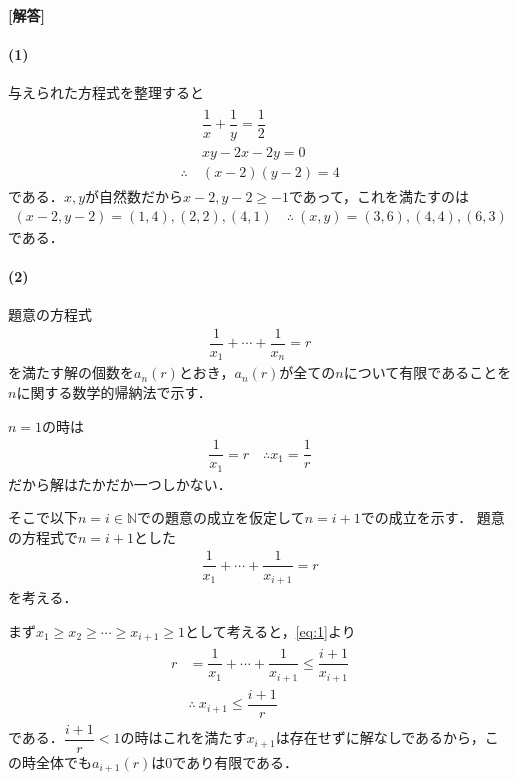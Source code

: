 \documentclass[../../main.tex]{subfiles}
\begin{document}
\begin{oframed}
  
\end{oframed}

{\bf [解答]}

\paragraph{(1)}

与えられた方程式を整理すると
\begin{align}
  \begin{split}
    & \dfrac{1}{x}+\dfrac{1}{y}=\dfrac{1}{2} \\
    & xy-2x-2y=0 \\
    \therefore\
    &(x-2)(y-2)=4
  \end{split}
\end{align}
である．$x, y$が自然数だから$x-2, y-2 \ge -1$であって，これを満たすのは
\begin{align}
  (x-2,y-2)=(1,4),(2,2),(4,1) \quad\therefore\ (x,y)=(3,6),(4,4),(6,3)
\end{align}
である．

\paragraph{(2)}

題意の方程式
\begin{align}
  \dfrac{1}{x_1}+\cdots+\dfrac{1}{x_{n}} = r
\end{align}
を満たす解の個数を$a_n(r)$とおき，$a_n(r)$が全ての$n$について有限であることを$n$に関する数学的帰納法で示す．

$n=1$の時は
\begin{align}
  \dfrac{1}{x_1} = r \quad\therefore x_1 = \dfrac{1}{r}
\end{align}
だから解はたかだか一つしかない．

そこで以下$n=i\in\mathbb{N}$での題意の成立を仮定して$n=i+1$での成立を示す．
題意の方程式で$n=i+1$とした
\begin{align}
  \dfrac{1}{x_1}+\cdots+\dfrac{1}{x_{i+1}} = r \label{eq:1}
\end{align}
を考える．

まず$x_1\ge x_2\ge\cdots\ge x_{i+1} \ge 1$として考えると，\cref{eq:1}より
\begin{align}
  \begin{split}
    r&=\dfrac{1}{x_1}+\cdots+\dfrac{1}{x_{i+1}}\le\dfrac{i+1}{x_{i+1}} \\
    &\therefore\ x_{i+1}\le\dfrac{i+1}{r}
  \end{split}
\end{align}
である．$\dfrac{i+1}{r}<1$の時はこれを満たす$x_{i+1}$は存在せずに解なしであるから，この時全体でも$a_{i+1}(r)$は$0$であり有限である．
\end{document}
